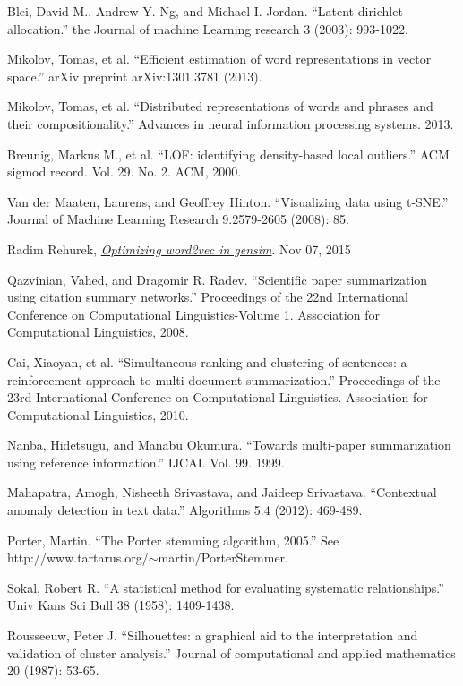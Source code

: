 \documentclass[conference,compsoc]{IEEEtran}
\begin{document}
\begin{thebibliography}{1}

Blei, David M., Andrew Y. Ng, and Michael I. Jordan. ``Latent dirichlet allocation.'' the Journal of machine Learning research 3 (2003): 993-1022.

Mikolov, Tomas, et al. ``Efficient estimation of word representations in vector space.'' arXiv preprint arXiv:1301.3781 (2013).

Mikolov, Tomas, et al. ``Distributed representations of words and phrases and their compositionality.'' Advances in neural information processing systems. 2013.


Breunig, Markus M., et al. ``LOF: identifying density-based local outliers.'' ACM sigmod record. Vol. 29. No. 2. ACM, 2000.

Van der Maaten, Laurens, and Geoffrey Hinton. ``Visualizing data using t-SNE.'' Journal of Machine Learning Research 9.2579-2605 (2008): 85.

Radim Rehurek, \href{https://radimrehurek.com/gensim/models/word2vec.html#id4}{\emph{Optimizing word2vec in gensim}}. Nov 07, 2015

Qazvinian, Vahed, and Dragomir R. Radev. ``Scientific paper summarization using citation summary networks.'' Proceedings of the 22nd International Conference on Computational Linguistics-Volume 1. Association for Computational Linguistics, 2008.

Cai, Xiaoyan, et al. ``Simultaneous ranking and clustering of sentences: a reinforcement approach to multi-document summarization.''  Proceedings of the 23rd International Conference on Computational Linguistics. Association for Computational Linguistics, 2010.

Nanba, Hidetsugu, and Manabu Okumura. ``Towards multi-paper summarization using reference information.'' IJCAI. Vol. 99. 1999.

Mahapatra, Amogh, Nisheeth Srivastava, and Jaideep Srivastava. ``Contextual anomaly detection in text data.'' Algorithms 5.4 (2012): 469-489.

Porter, Martin. ``The Porter stemming algorithm, 2005.'' See http://www.tartarus.org/$\sim$martin/PorterStemmer.

Sokal, Robert R. ``A statistical method for evaluating systematic relationships.'' Univ Kans Sci Bull 38 (1958): 1409-1438.

Rousseeuw, Peter J. ``Silhouettes: a graphical aid to the interpretation and validation of cluster analysis.'' Journal of computational and applied mathematics 20 (1987): 53-65.

\end{thebibliography}





\end{document}
